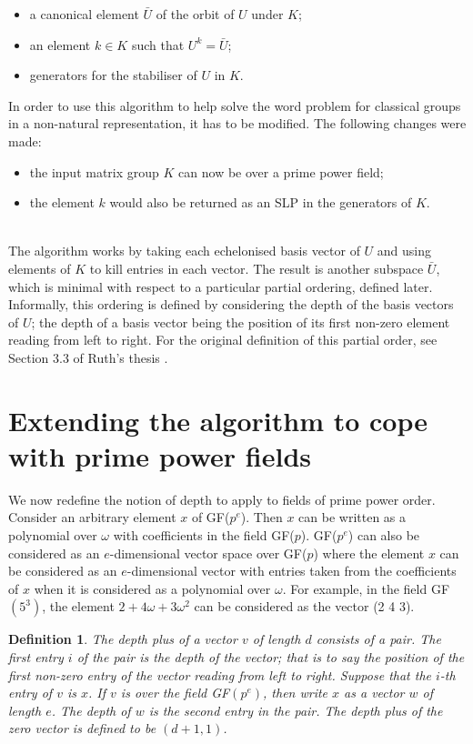\documentclass[12pt]{report}
\newtheorem{definition}{Definition}[section]
\begin{document}
\begin{itemize}
\item a canonical element $\bar{U}$ of the orbit of $U$ under $K$;
\item an element $k \in K$ such that $U^k = \bar{U}$;
\item generators for the stabiliser of $U$ in $K$.
\end{itemize}

In order to use this algorithm to help solve the word problem for classical groups in a non-natural representation, it has to be modified. The following changes were made:

\begin{itemize}
\item the input matrix group $K$ can now be over a prime power field;
\item the element $k$ would also be returned as an SLP in the generators of $K$.
\end{itemize}
\\

The algorithm works by taking each echelonised basis vector of $U$ and using elements of $K$ to kill entries in each vector. The result is another subspace $\bar{U}$, which is minimal with respect to a particular partial ordering, defined later. Informally, this ordering is defined by considering the depth of the basis vectors of $U$; the depth of a basis vector being the position of its first non-zero element reading from left to right. For the original definition of this partial order, see Section 3.3 of Ruth's thesis \cite{Ruth}.

\section{Extending the algorithm to cope with prime power fields}

We now redefine the notion of depth to apply to fields of prime power order. Consider an arbitrary element $x$ of GF($p^e$). Then $x$ can be written as a polynomial over $\omega$ with coefficients in the field GF($p$). GF($p^e$) can also be considered as an $e$-dimensional vector space over GF($p$) where the element $x$ can be considered as an $e$-dimensional vector with entries taken from the coefficients of $x$ when it is considered as a polynomial over $\omega$. For example, in the field GF$(5^3)$, the element $2 + 4\omega + 3\omega^2$ can be considered as the vector (2 4 3).

\begin{definition}
The \textit{depth plus} of a vector $v$ of length $d$ consists of a pair. The first entry $i$ of the pair is the depth of the vector; that is to say the position of the first non-zero entry of the vector reading from left to right. Suppose that the $i$-th entry of $v$ is $x$. If $v$ is over the field GF$(p^e)$, then write $x$ as a vector $w$ of length $e$. The depth of $w$ is the second entry in the pair. The depth plus of the zero vector is defined to be $(d+1, 1)$.
\end{definition}
\end{document}
